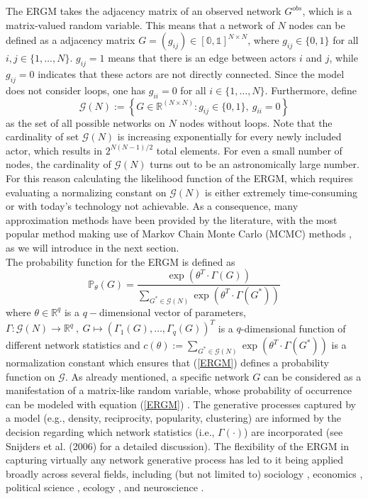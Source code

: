 \documentclass[10pt, conference, compsocconf]{IEEEtran}
\begin{document}
The ERGM takes the adjacency matrix of an observed network $G^{obs}$, which is a matrix-valued random variable. This means that a network of $N$ nodes can be defined as a adjacency matrix $G=(g_{ij})\in \mathbb{[0,1]}^{N \times N}$, where $g_{ij} \in \{0,1\}$ for all $i,j \in \{1,\dots , N\}$. $g_{ij}=1$ means that there is an edge between actors $i$ and $j$, while $g_{ij}=0$ indicates that these actors are not directly connected. Since the model does not consider loops, one has $g_{ii}=0$ for all $i \in \{1,\dots , N\}$. Furthermore, define
$$ \mathcal{G}(N) := \left\{ G \in \mathbb{R}^{(N \times N)}: g_{ij} \in \{0,1\},~g_{ii}=0\right\}$$
as the set of all possible networks on $N$ nodes without loops. Note that the cardinality of set $\mathcal{G}(N)$ is increasing exponentially for every newly included actor, which results in $2^{N(N-1)/2}$ total elements. For even a small number of nodes, the cardinality of $\mathcal{G}(N)$ turns out to be an astronomically large number. For this reason calculating the likelihood function of the ERGM, which requires evaluating a normalizing constant on $\mathcal{G}(N)$  is either extremely time-consuming or with today's technology not achievable. As a consequence, many approximation methods have been provided by the literature, with the most popular method making use of Markov Chain Monte Carlo (MCMC) methods \cite{hunter2012computational}, as we will introduce in the next section.\\  


The probability function for the ERGM is defined as
\begin{equation}
\mathbb{P}_{\theta}(G)=\dfrac{\exp(\theta^T \cdot \Gamma(G))}{\sum_{G^* \in \mathcal{G}(N)} \exp(\theta^T \cdot \Gamma(G^*))} 
\label{ERGM}
\end{equation}
%
where $\theta \in \mathbb{R}^q$ is a $q-$dimensional vector of parameters, $\Gamma:\mathcal{G}(N) \to \mathbb{R}^q~,~G \mapsto (\Gamma_1(G),\dots,\Gamma_q(G))^T$ is a $q$-dimensional function of different network statistics and $c(\theta):= \sum_{G^* \in \mathcal{G}(N)} \exp(\theta^T \cdot \Gamma(G^*))$ is a normalization constant which ensures that (\ref{ERGM}) defines a probability function on $\mathcal{G}$.
%
As already mentioned, a specific network $G$ can be considered as a manifestation of a matrix-like random variable, whose probability of occurrence can be modeled with equation (\ref{ERGM}) . The generative processes captured by a model (e.g., density, reciprocity, popularity, clustering) are informed by the decision regarding which network statistics (i.e., $\Gamma(\cdot)$) are incorporated (see Snijders et al. (2006) \cite{SnijdersTomA.B..2006} for a detailed discussion). The flexibility of the ERGM in capturing virtually any network generative process has led to it being applied broadly across several fields, including (but not limited to) sociology \cite{smith2016ethnic,srivastava2011culture}, economics \cite{lomi2012networks}, political science \cite{Cranmer.2011,lazer2010coevolution}, ecology \cite{dey2014individual,bouskila2015similarity}, and neuroscience \cite{simpson2011exponential,simpson2012exponential}.
\end{document}
